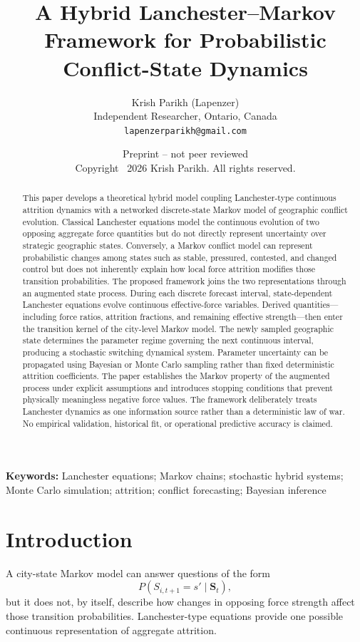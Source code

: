 \documentclass[11pt,letterpaper]{article}
\title{\textbf{A Hybrid Lanchester--Markov Framework for Probabilistic Conflict-State Dynamics}}
\author{Krish Parikh (Lapenzer)\\Independent Researcher, Ontario, Canada\\\texttt{lapenzerparikh@gmail.com}}
\date{Preprint -- not peer reviewed\\Copyright \textcopyright\ 2026 Krish Parikh. All rights reserved.}
\begin{document}
\maketitle

\begin{abstract}
This paper develops a theoretical hybrid model coupling Lanchester-type continuous attrition dynamics with a networked discrete-state Markov model of geographic conflict evolution. Classical Lanchester equations model the continuous evolution of two opposing aggregate force quantities but do not directly represent uncertainty over strategic geographic states. Conversely, a Markov conflict model can represent probabilistic changes among states such as stable, pressured, contested, and changed control but does not inherently explain how local force attrition modifies those transition probabilities. The proposed framework joins the two representations through an augmented state process. During each discrete forecast interval, state-dependent Lanchester equations evolve continuous effective-force variables. Derived quantities---including force ratios, attrition fractions, and remaining effective strength---then enter the transition kernel of the city-level Markov model. The newly sampled geographic state determines the parameter regime governing the next continuous interval, producing a stochastic switching dynamical system. Parameter uncertainty can be propagated using Bayesian or Monte Carlo sampling rather than fixed deterministic attrition coefficients. The paper establishes the Markov property of the augmented process under explicit assumptions and introduces stopping conditions that prevent physically meaningless negative force values. The framework deliberately treats Lanchester dynamics as one information source rather than a deterministic law of war. No empirical validation, historical fit, or operational predictive accuracy is claimed.
\end{abstract}

\noindent\textbf{Keywords:} Lanchester equations; Markov chains; stochastic hybrid systems; Monte Carlo simulation; attrition; conflict forecasting; Bayesian inference

\section{Introduction}
A city-state Markov model can answer questions of the form
\begin{equation}
P(S_{i,t+1}=s'\mid\mathbf{S}_t),
\end{equation}
but it does not, by itself, describe how changes in opposing force strength affect those transition probabilities. Lanchester-type equations provide one possible continuous representation of aggregate attrition.
\end{document}
